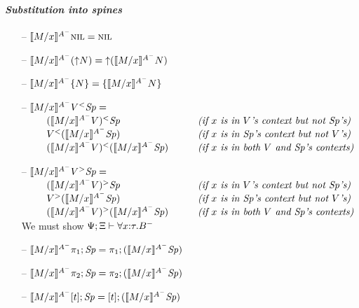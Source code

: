 \paragraph{\it Substitution into spines}

\begin{itemize}
\item[--] $\rsubsta{M}{x}{\tnil}{A^-} 
           = \tnil$
\item[--] $\rsubsta{M}{x}{(\tupl{N})}{A^-} 
           = \tupl{(\rsubsta{M}{x}{N}{A^-})}$
\item[--] $\rsubsta{M}{x}{\tlaxl{N}}{A^-} 
           = \tlaxl{\rsubsta{M}{x}{N}{A^-}}$
\item[--] $\rsubsta{M}{x}{\tappl{V}{\Sp}}{A^-} =$\\
    $\begin{array}{ll}
    \qquad \tappl{(\rsubsta{M}{x}{V}{A^-})}{\Sp}
     & \mbox{\it (if $x$ is in $V$'s context but not $\Sp$'s)}\\
    \qquad \tappl{V}{(\rsubsta{M}{x}{\Sp}{A^-})}
     & \mbox{\it (if $x$ is in $\Sp$'s context but not $V$'s)}\\
    \qquad \tappl{(\rsubsta{M}{x}{V}{A^-})}{(\rsubsta{M}{x}{\Sp}{A^-})}
     \qquad & \mbox{\it (if $x$ is in both $V$ and $\Sp$'s contexts)}
    \end{array}$
\item[--] $\rsubsta{M}{x}{\tappr{V}{\Sp}}{A^-} =$\\
    $\begin{array}{ll}
    \qquad \tappr{(\rsubsta{M}{x}{V}{A^-})}{\Sp}
     & \mbox{\it (if $x$ is in $V$'s context but not $\Sp$'s)}\\
    \qquad \tappr{V}{(\rsubsta{M}{x}{\Sp}{A^-})}
     & \mbox{\it (if $x$ is in $\Sp$'s context but not $V$'s)}\\
    \qquad \tappr{(\rsubsta{M}{x}{V}{A^-})}{(\rsubsta{M}{x}{\Sp}{A^-})}
     \qquad & \mbox{\it (if $x$ is in both $V$ and $\Sp$'s contexts)}
    \end{array}$ \smallskip\\
  We must show $\foc{\Psi}{\Xi}{\forall x{:}\tau. B^-}$

\smallskip
  
\item[--] $\rsubsta{M}{x}{\tpione{\Sp}}{A^-} 
           = \tpione{(\rsubsta{M}{x}{\Sp}{A^-})}$
\item[--] $\rsubsta{M}{x}{\tpitwo{\Sp}}{A^-} 
           = \tpitwo{(\rsubsta{M}{x}{\Sp}{A^-})}$
\item[--] $\rsubsta{M}{x}{\tforalll{t}{\Sp}}{A^-} 
           = \tforalll{t}{(\rsubsta{M}{x}{\Sp}{A^-})}$
\end{itemize}

